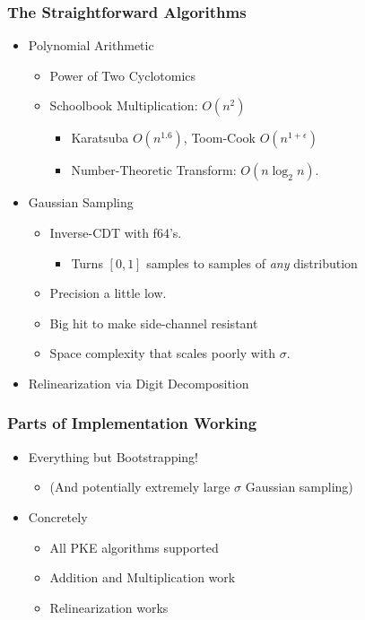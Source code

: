 \documentclass{beamer}
\theoremstyle{definition}
\begin{document}
\begin{frame}
	\frametitle{The Straightforward Algorithms}
	\begin{itemize}
		\item Polynomial Arithmetic\pause{}
		\begin{itemize}
			\item Power of Two Cyclotomics\pause{}
			\item Schoolbook Multiplication: $O(n^2)$\pause{}
			\begin{itemize}
				\item Karatsuba $O(n^{1.6})$, Toom-Cook $O(n^{1+\epsilon})$\pause{}
				\item Number-Theoretic Transform: $O(n\log_2n)$.
			\end{itemize}
		\end{itemize}
		\item Gaussian Sampling\pause{}
		\begin{itemize}
			\item Inverse-CDT with f64's.\pause{}
			\begin{itemize}
				\item Turns $[0,1]$ samples to samples of \emph{any} distribution\pause{}
			\end{itemize}
			\item Precision a little low.\pause{}
			\item Big hit to make side-channel resistant\pause
			\item Space complexity that scales poorly with $\sigma$.
		\end{itemize}
		\item Relinearization via Digit Decomposition
	\end{itemize}
\end{frame}

\begin{frame}
	\frametitle{Parts of Implementation Working}
	\begin{itemize}
		\item Everything but Bootstrapping!\pause{}
		\begin{itemize}
			\item (And potentially extremely large $\sigma$ Gaussian sampling)\pause{}
		\end{itemize}
		\item Concretely
		\begin{itemize}
			\item All PKE algorithms supported\pause{}
			\item Addition and Multiplication work\pause{}
			\item Relinearization works
		\end{itemize}
	\end{itemize}
\end{frame}
\end{document}
